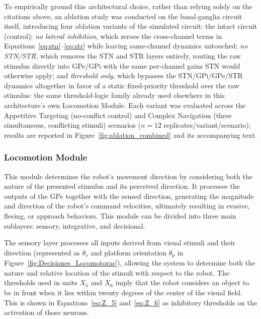 To empirically ground this architectural choice, rather than relying solely on the citations above, an ablation study was conducted on the basal-ganglia circuit itself, introducing four ablation variants of the simulated circuit: the intact circuit (control); \emph{no lateral inhibition}, which zeroes the cross-channel terms in Equations~\eqref{eq:stn}--\eqref{eq:str}  while leaving same-channel dynamics untouched; \emph{no STN/STR}, which removes the STN and STR layers entirely, routing the raw stimulus directly into GPe/GPi with the same per-channel gains STN would otherwise apply; and \emph{threshold only}, which bypasses the STN/GPi/GPe/STR dynamics altogether in favor of a static fixed-priority threshold over the raw stimulus: the same threshold-logic family already used elsewhere in this architecture's own Locomotion Module. Each variant was evaluated across the Appetitive Targeting (no-conflict control) and Complex Navigation (three simultaneous, conflicting stimuli) scenarios ($n=12$ replicates/variant/scenario); results are reported in Figure~\ref{fig:ablation_combined} and its accompanying text.

\subsubsection{Locomotion Module}

This module determines the robot's movement direction by considering both the nature of the presented stimulus and its perceived direction. It processes the outputs of the GPe together with the sensed direction, generating the magnitude and direction of the robot's command velocities, ultimately resulting in evasive, fleeing, or approach behaviors. This module can be divided into three main sublayers: sensory, integrative, and decisional. 

The sensory layer processes all inputs derived from visual stimuli and their direction (represented as $\theta_s$ and platform orientation $\theta_p$ in Figure~\ref{fig:Decisiones_Locomotoras}), allowing the system to determine both the nature and relative location of the stimuli with respect to the robot. The thresholds used in units $X_5$ and $X_6$ imply that the robot considers an object to be in front when it lies within twenty degrees of the center of the visual field. This is shown in Equations~\eqref{eq:Z_5} and~\eqref{eq:Z_6} as inhibitory thresholds on the activation of those neurons.

